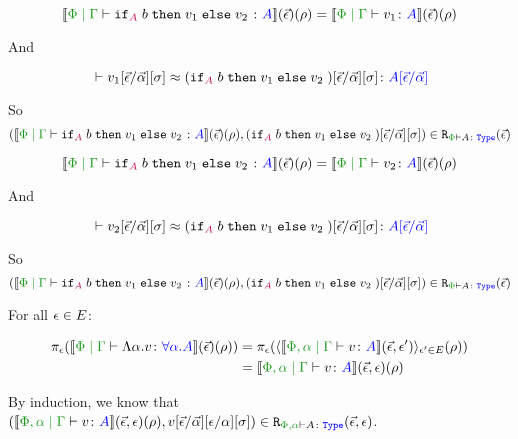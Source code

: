 \documentclass{Report}
\begin{document}

\begin{equation}
    \deno{\gpetyperelation{\pifthenelse{A}{b}{v_1}{v_2}}{A}}\fundRho = \deno{\gpetyperelation{v_1}{A}}\fundRho
\end{equation}

And

\begin{equation}
   \zberelation{ v_1\fundSub}{(\pifthenelse{A}{b}{v_1}{v_2})\fundSub}{A\ssub{\av}{\ev}}
\end{equation}

So
\begin{equation}
        \inLogRelPE{\deno{\gpetyperelation{\pifthenelse{A}{b}{v_1}{v_2}}{A}}\fundRho}{(\pifthenelse{A}{b}{v_1}{v_2})\fundSub}{A}
    \end{equation}


    \begin{equation}
        \deno{\gpetyperelation{\pifthenelse{A}{b}{v_1}{v_2}}{A}}\fundRho = \deno{\gpetyperelation{v_2}{A}}\fundRho
    \end{equation}
    
    And
    
    \begin{equation}
       \zberelation{v_2\fundSub}{(\pifthenelse{A}{b}{v_1}{v_2})\fundSub}{A\ssub{\av}{\ev}}
    \end{equation}
    
    So
    \begin{equation}
            \inLogRelPE{\deno{\gpetyperelation{\pifthenelse{A}{b}{v_1}{v_2}}{A}}\fundRho}{(\pifthenelse{A}{b}{v_1}{v_2})\fundSub}{A}
        \end{equation}
    

\case{\vgen}

For all $\epsilon\in E$:

\begin{align}
    \pe(\deno{\gpetyperelation{\elam{\a}{v}}{\all{\a}{A}}}\fundRho) & = \pe(\finpr{\deno{\etyperelation{\P,\a}{\G}{v}{A}}(\ev, \e')}{\e'\in E}(\rho)) 
    \\
    & = \deno{\etyperelation{\P,\a}{\G}{v}{A}}(\ev, \e)(\rho)
\end{align}

By induction, we know that $\inLogRel{\deno{\etyperelation{\P,\a}{\G}{v}{A}}(\ev, \e)(\rho)}{v\ssub{\av}{\ev}\ssub{\a}{\e}\ssi}{\P,\a}{A}{\ev, \e}$.
\end{document}
